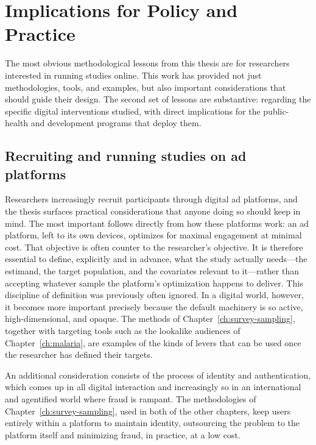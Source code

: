 \section{Implications for Policy and Practice}

The most obvious methodological lessons from this thesis are for researchers interested in running studies online. This work has provided not just methodologies, tools, and examples, but also important considerations that should guide their design. The second set of lessons are substantive: regarding the specific digital interventions studied, with direct implications for the public-health and development programs that deploy them.


\subsection{Recruiting and running studies on ad platforms}

Researchers increasingly recruit participants through digital ad platforms, and the thesis surfaces practical considerations that anyone doing so should keep in mind. The most important follows directly from how these platforms work: an ad platform, left to its own devices, optimizes for maximal engagement at minimal cost. That objective is often counter to the researcher's objective. It is therefore essential to define, explicitly and in advance, what the study actually needs---the estimand, the target population, and the covariates relevant to it---rather than accepting whatever sample the platform's optimization happens to deliver. This discipline of definition was previously often ignored. In a digital world, however, it becomes more important precisely because the default machinery is so active, high-dimensional, and opaque. The methods of Chapter~\ref{ch:survey-sampling}, together with targeting tools such as the lookalike audiences of Chapter~\ref{ch:malaria}, are examples of the kinds of levers that can be used once the researcher has defined their targets.

An additional consideration consists of the process of identity and authentication, which comes up in all digital interaction and increasingly so in an international and agentified world where fraud is rampant. The methodologies of Chapter~\ref{ch:survey-sampling}, used in both of the other chapters, keep users entirely within a platform to maintain identity, outsourcing the problem to the platform itself and minimizing fraud, in practice, at a low cost. 

